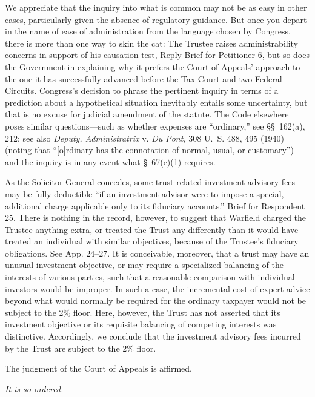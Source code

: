   We appreciate that the inquiry into what is common may not be as easy in other cases, particularly given the absence of regulatory guidance. But once you depart in the name of ease of administration from the language chosen by Congress, there is more than one way to skin the cat: The Trustee raises administrability concerns in support of his causation test, Reply Brief for Petitioner 6, but so does the Government in explaining why it prefers the Court of Appeals' approach to the one it has successfully advanced before the Tax Court and two Federal Circuits. Congress's decision to phrase the pertinent inquiry in terms of a prediction about a hypothetical situation inevitably entails some uncertainty, but that is no excuse for judicial amendment of the statute. The Code elsewhere poses similar questions---such as whether expenses are ``ordinary,'' see \S\S~162(a), 212; see also \emph{Deputy, Administratrix} v. \emph{Du Pont,} 308 U.~S. 488, 495 (1940) (noting that ``[o]rdinary has the connotation of normal, usual, or customary'')---and the inquiry is in any event what \S~67(e)(1) requires.

  As the Solicitor General concedes, some trust-related investment advisory fees may be fully deductible ``if an investment advisor were to impose a special, additional charge applicable only to its fiduciary accounts.'' Brief for Respondent 25. There is nothing in the record, however, to suggest that Warfield charged the Trustee anything extra, or treated the Trust any differently than it would have treated an individual with similar objectives, because of the Trustee's fiduciary obligations. See App. 24--27. It is conceivable, moreover, that a trust may have an unusual investment objective, or may require a specialized balancing of the \newpage  interests of various parties, such that a reasonable comparison with individual investors would be improper. In such a case, the incremental cost of expert advice beyond what would normally be required for the ordinary taxpayer would not be subject to the 2\% floor. Here, however, the Trust has not asserted that its investment objective or its requisite balancing of competing interests was distinctive. Accordingly, we conclude that the investment advisory fees incurred by the Trust are subject to the 2\% floor.

  The judgment of the Court of Appeals is affirmed.

\begin{flushright}\emph{It is so ordered.}\end{flushright}
